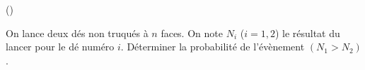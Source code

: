 \begin{exercice}\label{exo3-8} (\mortelexo)

On lance deux d\'es non truqu\'es \`a $n$ faces. On note $N_i$ ($i=1,2$) le r\'esultat du lancer pour le 
d\'e num\'ero $i$. D\'eterminer la probabilit\'e de l'\'ev\`enement $(N_1 > N_2)$.\\


\end{exercice}
